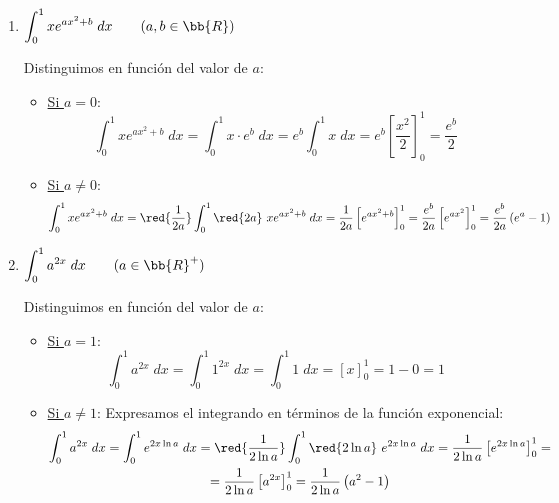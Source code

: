 \begin{ejercicio}
\begin{enumerate}
        \item $\displaystyle \int_0^1 xe^{ax^2+b}\;dx \qquad (a,b\in \bb{R})$
        
        Distinguimos en función del valor de $a$:
        \begin{itemize}
            \item \underline{Si $a=0$}:
            \begin{equation*}
                \int_0^1 xe^{ax^2+b}\;dx
                = \int_0^1 x\cdot e^b\;dx
                = e^b\int_0^1 x\;dx
                = e^b\left[\frac{x^2}{2}\right]_0^1
                = \frac{e^b}{2}
            \end{equation*}

            \item \underline{Si $a\neq 0$}:
            \begin{equation*}
                \int_0^1 xe^{ax^2+b}\;dx
                = \red{\frac{1}{2a}}\int_0^1 \red{2a}~xe^{ax^2+b}\;dx
                = \frac{1}{2a}\left[e^{ax^2+b}\right]_0^1
                = \frac{e^b}{2a}\left[e^{ax^2}\right]_0^1
                = \frac{e^b}{2a}\left(e^{a}-1\right)
            \end{equation*}
        \end{itemize}

        \item $\displaystyle \int_0^1 a^{2x}\;dx \qquad (a\in \bb{R}^+)$
        
        Distinguimos en función del valor de $a$:
        \begin{itemize}
            \item \underline{Si $a=1$}:
            \begin{equation*}
                \int_0^1 a^{2x}\;dx
                = \int_0^1 1^{2x}\;dx
                = \int_0^1 1\;dx
                = \left[x\right]_0^1
                = 1-0 = 1
            \end{equation*}

            \item \underline{Si $a\neq 1$}:
            Expresamos el integrando en términos de la función exponencial:
            \begin{multline*}
                \int_0^1 a^{2x}\;dx
                = \int_0^1 e^{2x\ln a}\;dx
                = \red{\frac{1}{2\ln a}}\int_0^1 \red{2\ln a}~e^{2x\ln a}\;dx
                = \frac{1}{2\ln a}\left[e^{2x\ln a}\right]_0^1
                =\\= \frac{1}{2\ln a}\left[a^{2x}\right]_0^1
                = \frac{1}{2\ln a}\left(a^2-1\right)
            \end{multline*}
        \end{itemize}


\end{enumerate}
\end{ejercicio}
